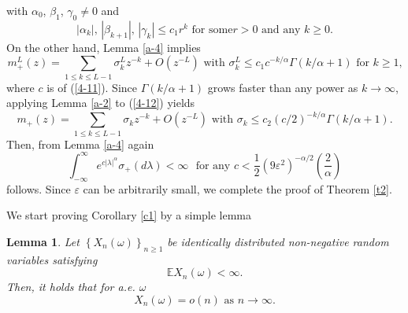 \documentclass[a4paper]{article}%
\newtheorem{lemma}{Lemma}
\begin{document}
with $\alpha_{0}$, $\beta_{1}$, $\gamma_{0}\neq0$ and%
\[
\left\vert \alpha_{k}\right\vert \text{, \ }\left\vert \beta_{k+1}\right\vert
\text{, \ }\left\vert \gamma_{k}\right\vert \leq c_{1}r^{k}\text{ \ for some
}r>0\text{ and any }k\geq0\text{.}%
\]
On the other hand, Lemma \ref{a-4} implies%
\[
m_{+}^{L}\left(  z\right)  =\sum_{1\leq k\leq L-1}\sigma_{k}^{L}%
z^{-k}+O\left(  z^{-L}\right)  \text{ with }\sigma_{k}^{L}\leq c_{1}%
c^{-k/\alpha}\Gamma\left(  k/\alpha+1\right)  \text{ for }k\geq1\text{,}%
\]
where $c$ is of (\ref{4-11}). Since $\Gamma\left(  k/\alpha+1\right)  $ grows
faster than any power as $k\rightarrow\infty$, applying Lemma \ref{a-2} to
(\ref{4-12}) yields%
\[
m_{+}\left(  z\right)  =\sum_{1\leq k\leq L-1}\sigma_{k}z^{-k}+O\left(
z^{-L}\right)  \text{ with }\sigma_{k}\leq c_{2}\left(  c/2\right)
^{-k/\alpha}\Gamma\left(  k/\alpha+1\right)  \text{.}%
\]
Then, from Lemma \ref{a-4} again
\[
\int_{-\infty}^{\infty}e^{c\left\vert \lambda\right\vert ^{\alpha}}\sigma
_{+}\left(  d\lambda\right)  <\infty\ \ \ \text{for any }c<\dfrac{1}{2}\left(
9\varepsilon^{2}\right)  ^{-\alpha/2}\left(  \dfrac{2}{\alpha}\right)
\]
follows. Since $\varepsilon$ can be arbitrarily small, we complete the proof
of Theorem \ref{t2}.\bigskip

We start proving Corollary \ref{c1} by a simple lemma

\begin{lemma}
\label{l4-3}Let $\left\{  X_{n}\left(  \omega\right)  \right\}  _{n\geq1}$ be
identically distributed non-negative random variables satisfying%
\[
\mathbb{E}X_{n}\left(  \omega\right)  <\infty\text{.}%
\]
Then, it holds that for a.e. $\omega$%
\begin{equation}
X_{n}\left(  \omega\right)  =o\left(  n\right)  \text{ \ as }n\rightarrow
\infty\text{.} \label{4-13}%
\end{equation}

\end{lemma}
\end{document}
